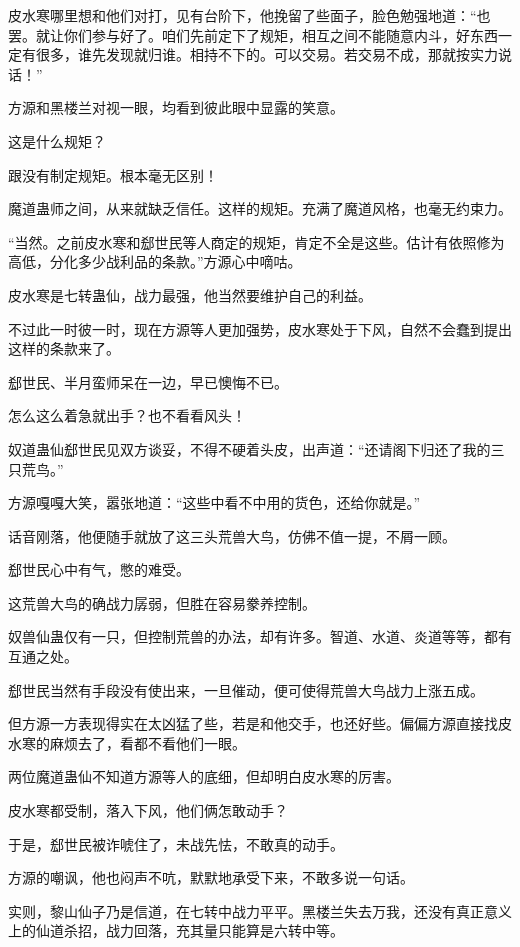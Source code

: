 \begin{this_body}
皮水寒哪里想和他们对打，见有台阶下，他挽留了些面子，脸色勉强地道：“也罢。就让你们参与好了。咱们先前定下了规矩，相互之间不能随意内斗，好东西一定有很多，谁先发现就归谁。相持不下的。可以交易。若交易不成，那就按实力说话！”

方源和黑楼兰对视一眼，均看到彼此眼中显露的笑意。

这是什么规矩？

跟没有制定规矩。根本毫无区别！

魔道蛊师之间，从来就缺乏信任。这样的规矩。充满了魔道风格，也毫无约束力。

“当然。之前皮水寒和郄世民等人商定的规矩，肯定不全是这些。估计有依照修为高低，分化多少战利品的条款。”方源心中嘀咕。

皮水寒是七转蛊仙，战力最强，他当然要维护自己的利益。

不过此一时彼一时，现在方源等人更加强势，皮水寒处于下风，自然不会蠢到提出这样的条款来了。

郄世民、半月蛮师呆在一边，早已懊悔不已。

怎么这么着急就出手？也不看看风头！

奴道蛊仙郄世民见双方谈妥，不得不硬着头皮，出声道：“还请阁下归还了我的三只荒鸟。”

方源嘎嘎大笑，嚣张地道：“这些中看不中用的货色，还给你就是。”

话音刚落，他便随手就放了这三头荒兽大鸟，仿佛不值一提，不屑一顾。

郄世民心中有气，憋的难受。

这荒兽大鸟的确战力孱弱，但胜在容易豢养控制。

奴兽仙蛊仅有一只，但控制荒兽的办法，却有许多。智道、水道、炎道等等，都有互通之处。

郄世民当然有手段没有使出来，一旦催动，便可使得荒兽大鸟战力上涨五成。

但方源一方表现得实在太凶猛了些，若是和他交手，也还好些。偏偏方源直接找皮水寒的麻烦去了，看都不看他们一眼。

两位魔道蛊仙不知道方源等人的底细，但却明白皮水寒的厉害。

皮水寒都受制，落入下风，他们俩怎敢动手？

于是，郄世民被诈唬住了，未战先怯，不敢真的动手。

方源的嘲讽，他也闷声不吭，默默地承受下来，不敢多说一句话。

实则，黎山仙子乃是信道，在七转中战力平平。黑楼兰失去万我，还没有真正意义上的仙道杀招，战力回落，充其量只能算是六转中等。


\end{this_body}
